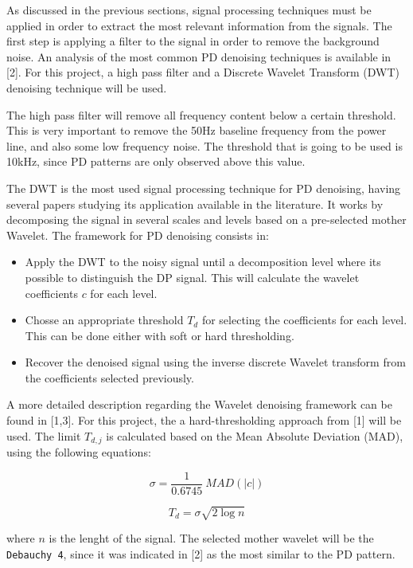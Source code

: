 \documentclass[11pt]{article}
\providecommand{\tightlist}{%
      \setlength{\itemsep}{0pt}\setlength{\parskip}{0pt}}
\begin{document}
As discussed in the previous sections, signal processing techniques must
be applied in order to extract the most relevant information from the
signals. The first step is applying a filter to the signal in order to
remove the background noise. An analysis of the most common PD denoising
techniques is available in {[}2{]}. For this project, a high pass filter
and a Discrete Wavelet Transform (DWT) denoising technique will be used.

The high pass filter will remove all frequency content below a certain
threshold. This is very important to remove the 50Hz baseline frequency
from the power line, and also some low frequency noise. The threshold
that is going to be used is 10kHz, since PD patterns are only observed
above this value.

The DWT is the most used signal processing technique for PD denoising,
having several papers studying its application available in the
literature. It works by decomposing the signal in several scales and
levels based on a pre-selected mother Wavelet. The framework for PD
denoising consists in:

\begin{itemize}
\tightlist
\item
  Apply the DWT to the noisy signal until a decomposition level where
  its possible to distinguish the DP signal. This will calculate the
  wavelet coefficients \(c\) for each level.
\item
  Chosse an appropriate threshold \(T_{d}\) for selecting the
  coefficients for each level. This can be done either with soft or hard
  thresholding.
\item
  Recover the denoised signal using the inverse discrete Wavelet
  transform from the coefficients selected previously.
\end{itemize}

A more detailed description regarding the Wavelet denoising framework
can be found in {[}1,3{]}. For this project, the a hard-thresholding
approach from {[}1{]} will be used. The limit \(T_{d,j}\) is calculated
based on the Mean Absolute Deviation (MAD), using the following
equations:

\[\sigma = \frac{1}{0.6745}~MAD(|c|) \]

\[T_{d} = \sigma\sqrt{2\log{n}} \]

where \(n\) is the lenght of the signal. The selected mother wavelet
will be the \texttt{Debauchy\ 4}, since it was indicated in {[}2{]} as
the most similar to the PD pattern.
\end{document}
